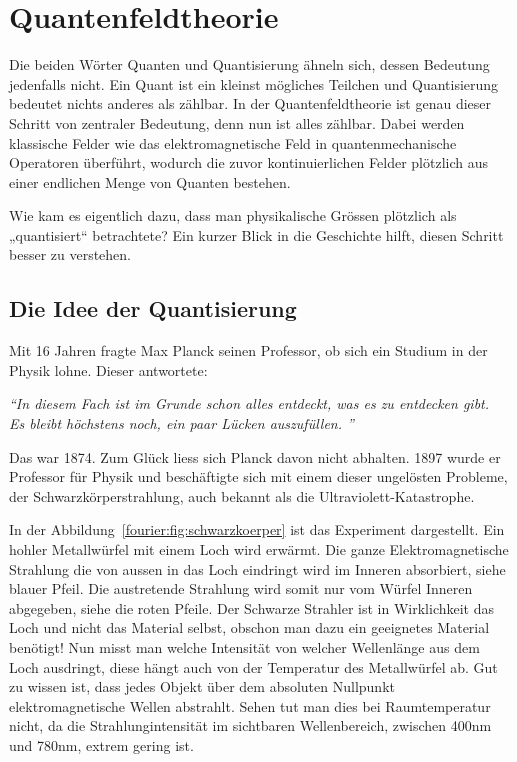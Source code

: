 %
%
%
%
\section{Quantenfeldtheorie\label{fourier:section:quantenfeldtheorie}}
Die beiden Wörter Quanten und Quantisierung ähneln sich, dessen Bedeutung jedenfalls nicht. 
Ein Quant ist ein kleinst mögliches Teilchen und Quantisierung bedeutet nichts anderes als zählbar. 
In der Quantenfeldtheorie ist genau dieser Schritt von zentraler Bedeutung, denn nun ist alles zählbar. 
Dabei werden klassische Felder wie das elektromagnetische Feld in quantenmechanische Operatoren überführt, wodurch die zuvor kontinuierlichen Felder plötzlich aus einer endlichen Menge von Quanten bestehen.

Wie kam es eigentlich dazu, dass man physikalische Grössen plötzlich als „quantisiert“ betrachtete?
Ein kurzer Blick in die Geschichte hilft, diesen Schritt besser zu verstehen.

\subsection{Die Idee der Quantisierung\label{fourier:subsection:DieIdeeDerQuantisierung}}
	Mit 16 Jahren fragte Max Planck seinen Professor, ob sich ein Studium in der Physik lohne. 
	Dieser antwortete:
	
	\begin{flushleft}
		\textit{``{}In diesem Fach ist im Grunde schon alles entdeckt, was es zu entdecken gibt. \\
		Es bleibt höchstens noch, ein paar Lücken auszufüllen. ''}
	\end{flushleft}
	
	Das war 1874.
	Zum Glück liess sich Planck davon nicht abhalten.
	1897 wurde er Professor für Physik und beschäftigte sich mit einem dieser ungelösten Probleme, der Schwarzkörperstrahlung, auch bekannt als die Ultraviolett-Katastrophe. 
	
	
	In der Abbildung~\ref{fourier:fig:schwarzkoerper} ist das Experiment dargestellt. Ein hohler Metallwürfel mit einem Loch wird erwärmt. Die ganze Elektromagnetische Strahlung die von aussen in das Loch eindringt wird im Inneren absorbiert, siehe blauer Pfeil. Die austretende Strahlung wird somit nur vom Würfel Inneren abgegeben, siehe die roten Pfeile. Der Schwarze Strahler ist in Wirklichkeit das Loch und nicht das Material selbst, obschon man dazu ein geeignetes Material benötigt! Nun misst man welche Intensität von welcher Wellenlänge aus dem Loch ausdringt, diese hängt auch von der Temperatur des Metallwürfel ab. 
	Gut zu wissen ist, dass jedes Objekt über dem absoluten Nullpunkt elektromagnetische Wellen abstrahlt. 
	Sehen tut man dies bei Raumtemperatur nicht, da die Strahlungintensität im sichtbaren Wellenbereich, zwischen 400nm und 780nm, extrem gering ist. 
	
